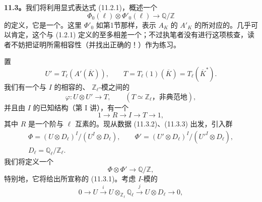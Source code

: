 \textbf{11.3。}我们将利用显式表达式 (11.2.1)，概述一个
\begin{equation}\tag{11.3.1}
 \Phi_0(\ell)\otimes\Phi'_0(\ell)\longrightarrow\mathbb Q/\mathbb Z
\end{equation}
的定义，它是一个。这里 $\Phi'_0$ 如第1节那样，表示 $A_K$ 的 $A'_K$ 的所对应的。几乎可以肯定，这个与 (1.2.1) 定义的至多相差一个；不过执笔者没有进行这项核查，读者不妨把证明所需相容性（并找出正确的！）作为练习。

置
\[
 U'=T_\ell(A'(\overline K)),\qquad
 T=T_\ell(1)(\overline K)=T_\ell(\overline K^*).
\]
我们有一个与 $I$ 的相容的、 $\mathbb Z_\ell$-模之间的
\begin{equation}\tag{11.3.2}
 \varphi:U\otimes U'\longrightarrow T,
 \qquad (T\simeq\mathbb Z_\ell\text{，非典范地}),
\end{equation}
并且由 $I$ 的已知结构（第 I 讲），有一个
\begin{equation}\tag{11.3.3}
 1\longrightarrow R\longrightarrow I\longrightarrow T\longrightarrow1,
\end{equation}
其中 $R$ 是一个阶与 $\ell$ 互素的。现从数据 (11.3.2)、(11.3.3) 出发，引入群
\begin{equation}\tag{11.3.4}
 \begin{gathered}
 \Phi=(U\otimes D_\ell)^I/(U^I\otimes D_\ell),\qquad
 \Phi'=(U'\otimes D_\ell)^I/(U'^I\otimes D_\ell),\\
 D_\ell=\mathbb Q_\ell/\mathbb Z_\ell.
 \end{gathered}
\end{equation}
我们将定义一个
\begin{equation}\tag{11.3.5}
 \Phi\otimes\Phi'\longrightarrow\mathbb Q/\mathbb Z,
\end{equation}
特别地，它将给出所宣称的 (11.3.1)。考虑 $I$-模的
\begin{equation}\tag{11.3.6}
 0\longrightarrow U\xrightarrow{i}U\otimes_{\mathbb Z_\ell}\mathbb Q_\ell
 \xrightarrow{j}U\otimes D_\ell\longrightarrow0,
\end{equation}
